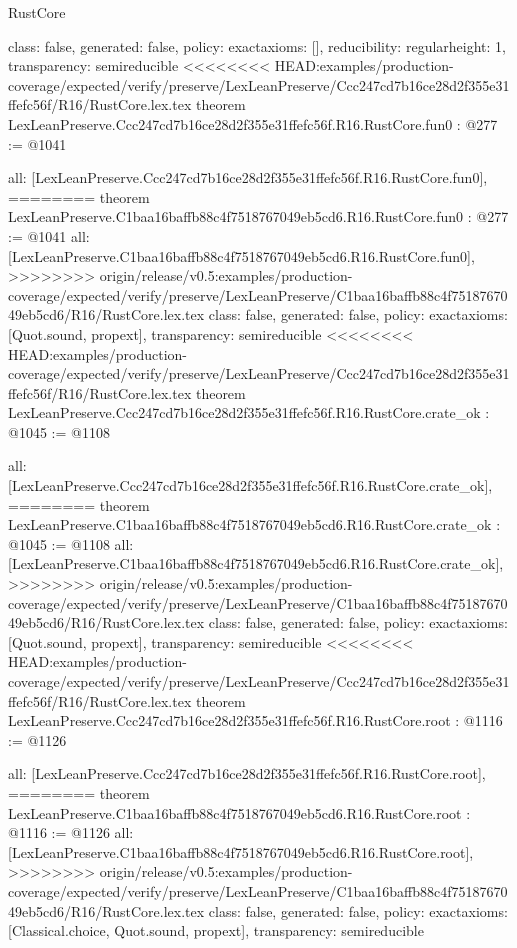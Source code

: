 \begin{lexlean}{RustCore}
\begin{coremodule}
{\begin{coremodule}
{{{  class: false,
  generated: false,
  policy: exact{axioms: []},
  reducibility: regular{height: 1},
  transparency: semireducible
}
<<<<<<<< HEAD:examples/production-coverage/expected/verify/preserve/LexLeanPreserve/Ccc247cd7b16ce28d2f355e31ffefc56f/R16/RustCore.lex.tex
theorem LexLeanPreserve.Ccc247cd7b16ce28d2f355e31ffefc56f.R16.RustCore.fun0 : @277 := @1041 {
  all: [LexLeanPreserve.Ccc247cd7b16ce28d2f355e31ffefc56f.R16.RustCore.fun0],
========
theorem LexLeanPreserve.C1baa16baffb88c4f7518767049eb5cd6.R16.RustCore.fun0 : @277 := @1041 {
  all: [LexLeanPreserve.C1baa16baffb88c4f7518767049eb5cd6.R16.RustCore.fun0],
>>>>>>>> origin/release/v0.5:examples/production-coverage/expected/verify/preserve/LexLeanPreserve/C1baa16baffb88c4f7518767049eb5cd6/R16/RustCore.lex.tex
  class: false,
  generated: false,
  policy: exact{axioms: [Quot.sound, propext]},
  transparency: semireducible
}
<<<<<<<< HEAD:examples/production-coverage/expected/verify/preserve/LexLeanPreserve/Ccc247cd7b16ce28d2f355e31ffefc56f/R16/RustCore.lex.tex
theorem LexLeanPreserve.Ccc247cd7b16ce28d2f355e31ffefc56f.R16.RustCore.crate_ok : @1045 := @1108 {
  all: [LexLeanPreserve.Ccc247cd7b16ce28d2f355e31ffefc56f.R16.RustCore.crate_ok],
========
theorem LexLeanPreserve.C1baa16baffb88c4f7518767049eb5cd6.R16.RustCore.crate_ok : @1045 := @1108 {
  all: [LexLeanPreserve.C1baa16baffb88c4f7518767049eb5cd6.R16.RustCore.crate_ok],
>>>>>>>> origin/release/v0.5:examples/production-coverage/expected/verify/preserve/LexLeanPreserve/C1baa16baffb88c4f7518767049eb5cd6/R16/RustCore.lex.tex
  class: false,
  generated: false,
  policy: exact{axioms: [Quot.sound, propext]},
  transparency: semireducible
}
<<<<<<<< HEAD:examples/production-coverage/expected/verify/preserve/LexLeanPreserve/Ccc247cd7b16ce28d2f355e31ffefc56f/R16/RustCore.lex.tex
theorem LexLeanPreserve.Ccc247cd7b16ce28d2f355e31ffefc56f.R16.RustCore.root : @1116 := @1126 {
  all: [LexLeanPreserve.Ccc247cd7b16ce28d2f355e31ffefc56f.R16.RustCore.root],
========
theorem LexLeanPreserve.C1baa16baffb88c4f7518767049eb5cd6.R16.RustCore.root : @1116 := @1126 {
  all: [LexLeanPreserve.C1baa16baffb88c4f7518767049eb5cd6.R16.RustCore.root],
>>>>>>>> origin/release/v0.5:examples/production-coverage/expected/verify/preserve/LexLeanPreserve/C1baa16baffb88c4f7518767049eb5cd6/R16/RustCore.lex.tex
  class: false,
  generated: false,
  policy: exact{axioms: [Classical.choice, Quot.sound, propext]},
  transparency: semireducible
}

}}}}}
\end{coremodule}}
\end{coremodule}
\end{lexlean}
